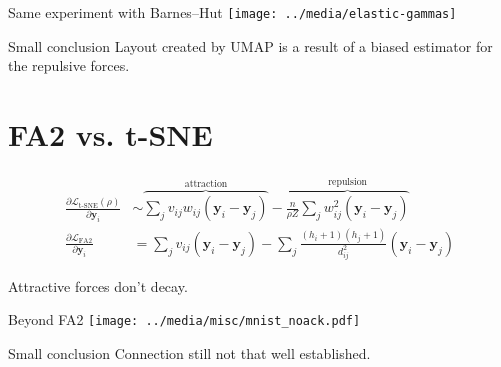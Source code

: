 \documentclass{beamer}
\begin{document}
\begin{frame}{Same experiment with Barnes–Hut}
  \texttt{[image: ../media/elastic-gammas]}
\end{frame}

\begin{frame}{Small conclusion}
  Layout created by UMAP is a result of a biased estimator for the
  repulsive forces.
\end{frame}

\section*{FA2 vs. t-SNE}

\begin{frame}{}
  \begin{align}
    \frac{\partial \mathcal L_{\textrm{t-SNE}}(\rho)}{\partial \mathbf y_i} &\sim \overbrace{\sum_j v_{ij}w_{ij}(\mathbf y_i-\mathbf y_j)}^{\text{attraction}} - \overbrace{\frac{n}{\rho Z}\sum_j w_{ij}^2(\mathbf y_i-\mathbf y_j)}^{\text{repulsion}} \nonumber\\
    \frac{\partial \mathcal L_{\textrm{FA2}}}{\partial \mathbf y_i} &= \sum_j v_{ij}(\mathbf y_i-\mathbf y_j) - \sum_j \frac{(h_i+1)(h_j+1)}{d_{ij}^2}(\mathbf y_i-\mathbf y_j) \label{eq:FA2gradient}
  \end{align}

  \bigskip\pause Attractive forces don't decay.
\end{frame}

\begin{frame}{Beyond FA2 \citep{noack2009modularity}}
  \centering\texttt{[image: ../media/misc/mnist\_noack.pdf]}
\end{frame}

\begin{frame}{Small conclusion}
  Connection still not that well established.
\end{frame}
\end{document}
